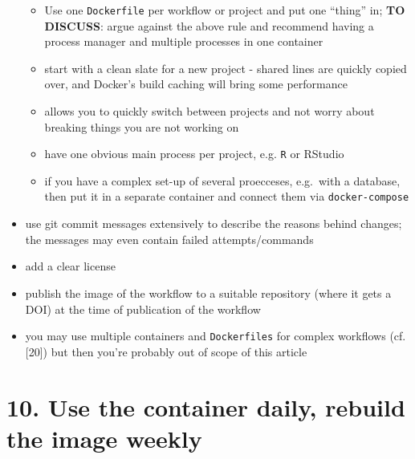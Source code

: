 \documentclass[10pt,letterpaper]{article}
\providecommand{\tightlist}{%
  \setlength{\itemsep}{0pt}\setlength{\parskip}{0pt}}
\begin{document}
\begin{itemize}
  \begin{itemize}
  \tightlist
  \item
    Use one \texttt{Dockerfile} per workflow or project and put one
    ``thing'' in; \textbf{TO DISCUSS}: argue against the above rule and
    recommend having a process manager and multiple processes in one
    container
  \item
    start with a clean slate for a new project - shared lines are
    quickly copied over, and Docker's build caching will bring some
    performance
  \item
    allows you to quickly switch between projects and not worry about
    breaking things you are not working on
  \item
    have one obvious main process per project, e.g. \texttt{R} or
    RStudio
  \item
    if you have a complex set-up of several proecceses, e.g.~with a
    database, then put it in a separate container and connect them via
    \texttt{docker-compose}
  \end{itemize}
\item
  use git commit messages extensively to describe the reasons behind
  changes; the messages may even contain failed attempts/commands
\item
  add a clear license
\item
  publish the image of the workflow to a suitable repository (where it
  gets a DOI) at the time of publication of the workflow
\item
  you may use multiple containers and \texttt{Dockerfiles} for complex
  workflows (cf. {[}20{]}) but then you're probably out of scope of this
  article
\end{itemize}

\hypertarget{use-the-container-daily-rebuild-the-image-weekly}{%
\section*{10. Use the container daily, rebuild the image
weekly}\label{use-the-container-daily-rebuild-the-image-weekly}}
\end{document}
